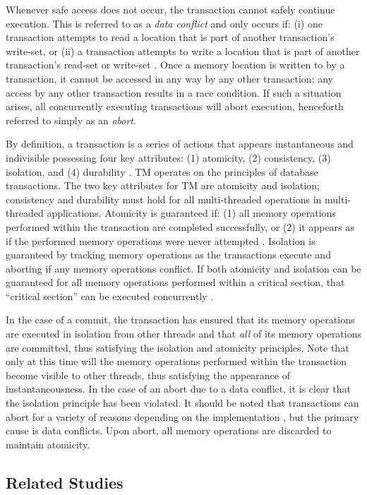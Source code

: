 \documentclass{sig-alternate}
\begin{document}
Whenever safe access does not occur, the transaction cannot safely continue execution.
This is referred to as a \emph{data conflict} and only occurs if: (i) one transaction
attempts to read a location that is part of another transaction's write-set, or (ii) a
transaction attempts to write a location that is part of another transaction's read-set or
write-set \cite{intel_prog_ref}.  Once a memory location is written to by a transaction,
it cannot be accessed in any way by any other transaction; any access by any other
transaction results in a race condition.  If such a situation arises, all concurrently
executing transactions will abort execution, henceforth referred to simply as an
\emph{abort}.

By definition, a transaction is a series of actions that appears instantaneous and
indivisible possessing four key attributes: (1) atomicity, (2) consistency, (3) isolation,
and (4) durability \cite{tm_2nd}.  TM operates on the principles of database transactions.
The two key attributes for TM are atomicity and isolation; consistency and durability must
hold for all multi-threaded operations in multi-threaded applications.  Atomicity is
guaranteed if: (1) all memory operations performed within the transaction are completed
successfully, or (2) it appears as if the performed memory operations were never attempted
\cite{tm_2nd}.  Isolation is guaranteed by tracking memory operations as the transactions
execute and aborting if any memory operations conflict.  If both atomicity and isolation
can be guaranteed for all memory operations performed within a critical section, that
``critical section'' can be executed concurrently \cite{sle_rajwar}.

In the case of a commit, the transaction has ensured that its memory operations are
executed in isolation from other threads and that \emph{all} of its memory operations are
committed, thus satisfying the isolation and atomicity principles.  Note that only at this
time will the memory operations performed within the transaction become visible to other
threads, thus satisfying the appearance of instantaneousness.  In the case of an abort due
to a data conflict, it is clear that the isolation principle has been violated.  It should
be noted that transactions can abort for a variety of reasons depending on the
implementation \cite{intel_opt_man,chung_amd}, but the primary cause is data conflicts.
Upon abort, all memory operations are discarded to maintain atomicity.

\subsection{Related Studies}
\end{document}

